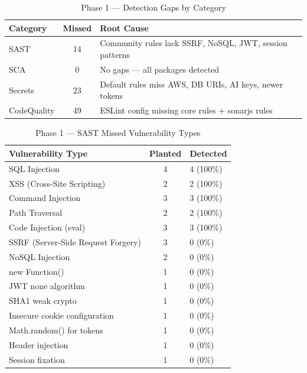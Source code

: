 \documentclass[12pt,a4paper]{report}
\begin{document}
\begin{table}[H]
\centering
\caption{Phase 1 --- Detection Gaps by Category}
\label{tab:phase1_gaps}
\begin{tabular}{|l|c|l|}
\hline
\textbf{Category} & \textbf{Missed} & \textbf{Root Cause} \\
\hline
SAST & 14 & Community rules lack SSRF, NoSQL, JWT, session patterns \\
\hline
SCA & 0 & No gaps --- all packages detected \\
\hline
Secrets & 23 & Default rules miss AWS, DB URIs, AI keys, newer tokens \\
\hline
CodeQuality & 49 & ESLint config missing core rules + sonarjs rules \\
\hline
\end{tabular}
\end{table}

\begin{table}[H]
\centering
\caption{Phase 1 --- SAST Missed Vulnerability Types}
\label{tab:sast_missed}
\begin{tabular}{|l|c|l|}
\hline
\textbf{Vulnerability Type} & \textbf{Planted} & \textbf{Detected} \\
\hline
SQL Injection & 4 & 4 (100\%) \\
\hline
XSS (Cross-Site Scripting) & 2 & 2 (100\%) \\
\hline
Command Injection & 3 & 3 (100\%) \\
\hline
Path Traversal & 2 & 2 (100\%) \\
\hline
Code Injection (eval) & 3 & 3 (100\%) \\
\hline
SSRF (Server-Side Request Forgery) & 3 & 0 (0\%) \\
\hline
NoSQL Injection & 2 & 0 (0\%) \\
\hline
new Function() & 1 & 0 (0\%) \\
\hline
JWT none algorithm & 1 & 0 (0\%) \\
\hline
SHA1 weak crypto & 1 & 0 (0\%) \\
\hline
Insecure cookie configuration & 1 & 0 (0\%) \\
\hline
Math.random() for tokens & 1 & 0 (0\%) \\
\hline
Header injection & 1 & 0 (0\%) \\
\hline
Session fixation & 1 & 0 (0\%) \\
\hline
\end{tabular}
\end{table}
\end{document}
